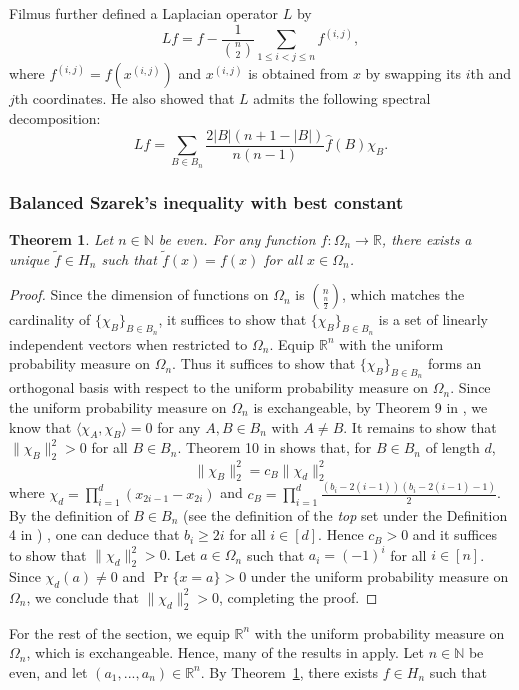\documentclass[11pt]{article}
\newtheorem{theorem}{Theorem}
\begin{document}
Filmus \cite[Section 6]{Filmus16} further defined a Laplacian operator $L$ by 
\[
Lf = f - \frac{1}{\binom{n}{2}}\sum_{1\leq i<j \leq n}f^{(i,j)},
\]
where $f^{(i,j)}=f(x^{(i,j)})$ and $x^{(i,j)}$ is obtained from $x$ by swapping its $i$th and $j$th coordinates. He also showed that $L$ admits the following spectral decomposition:
\[
Lf = \sum_{B \in B_n} \frac{2|B|(n+1-|B|)}{n(n-1)}\widehat f(B) \chi_B.
\]


\subsubsection{Balanced Szarek's inequality with best constant}
\begin{theorem}\label{uniqueness}
Let $n \in \mathbb{N}$ be even. For any function $f:\Omega_n \to \mathbb{R}$, there exists a unique $\tilde f \in H_n$ such that $\tilde f(x)= f(x)$ for all $x \in \Omega_n$.
\end{theorem}
\begin{proof}
Since the dimension of functions on $\Omega_n$ is $\binom{n}{\frac{n}{2}}$, which matches the cardinality of $\{\chi_B\}_{B\in B_n}$, it suffices to show that $\{\chi_B\}_{B\in B_n}$ is a set of linearly independent vectors when restricted to $\Omega_n$. Equip $\mathbb{R}^n$ with the uniform probability measure on $\Omega_n$. Thus it suffices to show that $\{\chi_B\}_{B\in B_n}$ forms an orthogonal basis with respect to the uniform probability measure on $\Omega_n$. Since the uniform probability measure on $\Omega_n$ is exchangeable, by Theorem 9 in \cite{Filmus16}, we know that $\langle \chi_A,\chi_B \rangle =0 $ for any $A,B \in B_n$ with $A \neq B$. It remains to show that $\| \chi_B\|^2_2> 0$ for all $B \in B_n$. Theorem 10 in \cite{Filmus16} shows that, for $B \in B_n$ of length $d$,
\[
\| \chi_B\|_2^2=c_B\|\chi_d\|_2^2
\]
where $\chi_d=\prod_{i=1}^d (x_{2i-1}-x_{2i})$ and $c_B= \prod_{i=1}^d \frac{(b_i - 2(i-1))(b_i - 2(i-1)-1)}{2} $. By the definition of $B \in B_n$ (see the definition of the {\em top} set under the Definition 4 in \cite{Filmus16}) , one can deduce that $b_i \geq 2i$ for all $i \in [d]$. Hence $c_B>0$ and it suffices to show that $\| \chi_d\|_2^2 >0.$ Let $a\in \Omega_n$ such that $a_i=(-1)^i$ for all $i \in [n]$. Since $\chi_d(a) \neq 0$ and $\Pr\{x =a\}>0$ under the uniform probability measure on $\Omega_n$, we conclude that $\|\chi_d\|_2^2 > 0$, completing the proof. 
\end{proof}
For the rest of the section, we equip $\mathbb{R}^n$ with the uniform probability measure on $\Omega_n$, which is exchangeable. Hence, many of the results in \cite{Filmus16} apply. Let $n \in \mathbb{N}$ be even, and let $(a_1,...,a_n) \in \mathbb{R}^n$. By Theorem~\ref{uniqueness}, there exists $f \in H_n$ such that
\end{document}
